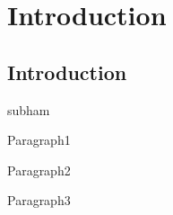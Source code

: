 
\chapter{Introduction} %

\label{c1} %


\section{Introduction}

subham \cite{drewil2022air}
\par Paragraph1
\par Paragraph2
\par Paragraph3
